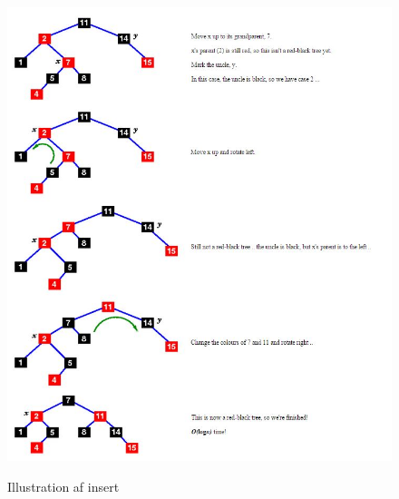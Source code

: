 \documentclass[11pt,a4paper]{report}
\theoremstyle{plain}
\theoremstyle{definition}
\theoremstyle{remark}
\numberwithin{equation}{section}
\begin{document}
\begin{figure}[H]
  \centering
  \includegraphics[scale=0.7]{RBInsert2.jpg}\\
  \caption{Illustration af insert}
\end{figure}

\newpage

%
%
%
%
%
\end{document}
